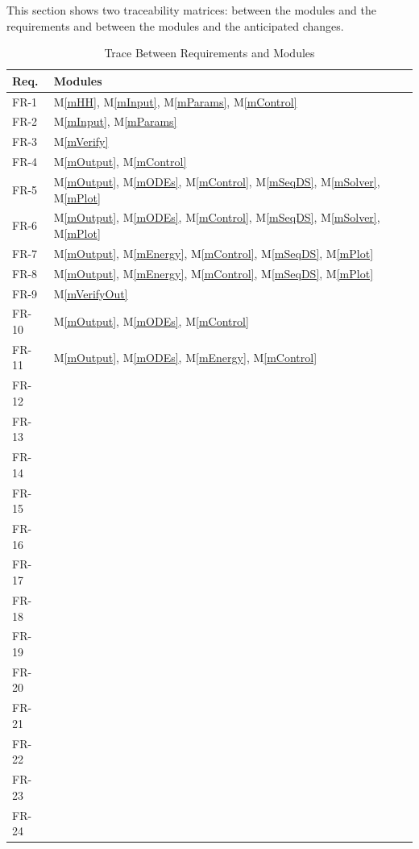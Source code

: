 \documentclass[12pt, titlepage]{article}
\newcommand{\mref}[1]{M\ref{#1}}
\begin{document}
This section shows two traceability matrices: between the modules and the
requirements and between the modules and the anticipated changes.

\begin{table}[H]
\centering
\begin{tabular}{p{} p{}}
\toprule
\textbf{Req.} & \textbf{Modules}\\
\midrule
FR-1 & \mref{mHH}, \mref{mInput}, \mref{mParams}, \mref{mControl}\\
FR-2 & \mref{mInput}, \mref{mParams}\\
FR-3 & \mref{mVerify}\\
FR-4 & \mref{mOutput}, \mref{mControl}\\
FR-5 & \mref{mOutput}, \mref{mODEs}, \mref{mControl}, \mref{mSeqDS}, \mref{mSolver}, \mref{mPlot}\\
FR-6 & \mref{mOutput}, \mref{mODEs}, \mref{mControl}, \mref{mSeqDS}, \mref{mSolver}, \mref{mPlot}\\
FR-7 & \mref{mOutput}, \mref{mEnergy}, \mref{mControl}, \mref{mSeqDS}, \mref{mPlot}\\
FR-8 & \mref{mOutput}, \mref{mEnergy}, \mref{mControl}, \mref{mSeqDS}, \mref{mPlot}\\
FR-9 & \mref{mVerifyOut}\\
FR-10 & \mref{mOutput}, \mref{mODEs}, \mref{mControl}\\
FR-11 & \mref{mOutput}, \mref{mODEs}, \mref{mEnergy}, \mref{mControl}\\
FR-12 & \\
FR-13 & \\
FR-14 & \\
FR-15 & \\
FR-16 & \\
FR-17 & \\
FR-18 & \\
FR-19 & \\
FR-20 & \\
FR-21 & \\
FR-22 & \\
FR-23 & \\
FR-24 & \\
\bottomrule
\end{tabular}
\caption{Trace Between Requirements and Modules}
\label{TblRT}
\end{table}
\end{document}
